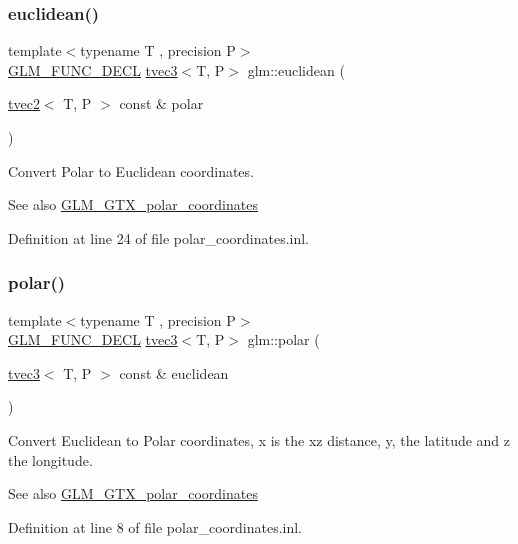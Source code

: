 \subsubsection{\texorpdfstring{euclidean()}{euclidean()}}
{\footnotesize\ttfamily template$<$typename T , precision P$>$ \\
\mbox{\hyperlink{setup_8hpp_ab2d052de21a70539923e9bcbf6e83a51}{G\+L\+M\+\_\+\+F\+U\+N\+C\+\_\+\+D\+E\+CL}} \mbox{\hyperlink{structglm_1_1tvec3}{tvec3}}$<$T, P$>$ glm\+::euclidean (\begin{DoxyParamCaption}\item[{\mbox{\hyperlink{structglm_1_1tvec2}{tvec2}}$<$ T, P $>$ const \&}]{polar }\end{DoxyParamCaption})}

Convert Polar to Euclidean coordinates.

\begin{DoxySeeAlso}{See also}
\mbox{\hyperlink{group__gtx__polar__coordinates}{G\+L\+M\+\_\+\+G\+T\+X\+\_\+polar\+\_\+coordinates}} 
\end{DoxySeeAlso}


Definition at line 24 of file polar\+\_\+coordinates.\+inl.

\mbox{\label{group__gtx__polar__coordinates_gafcf95a38c780a4ad5ba14c8ac9e522bb}} 
\subsubsection{\texorpdfstring{polar()}{polar()}}
{\footnotesize\ttfamily template$<$typename T , precision P$>$ \\
\mbox{\hyperlink{setup_8hpp_ab2d052de21a70539923e9bcbf6e83a51}{G\+L\+M\+\_\+\+F\+U\+N\+C\+\_\+\+D\+E\+CL}} \mbox{\hyperlink{structglm_1_1tvec3}{tvec3}}$<$T, P$>$ glm\+::polar (\begin{DoxyParamCaption}\item[{\mbox{\hyperlink{structglm_1_1tvec3}{tvec3}}$<$ T, P $>$ const \&}]{euclidean }\end{DoxyParamCaption})}

Convert Euclidean to Polar coordinates, x is the xz distance, y, the latitude and z the longitude.

\begin{DoxySeeAlso}{See also}
\mbox{\hyperlink{group__gtx__polar__coordinates}{G\+L\+M\+\_\+\+G\+T\+X\+\_\+polar\+\_\+coordinates}} 
\end{DoxySeeAlso}


Definition at line 8 of file polar\+\_\+coordinates.\+inl.

